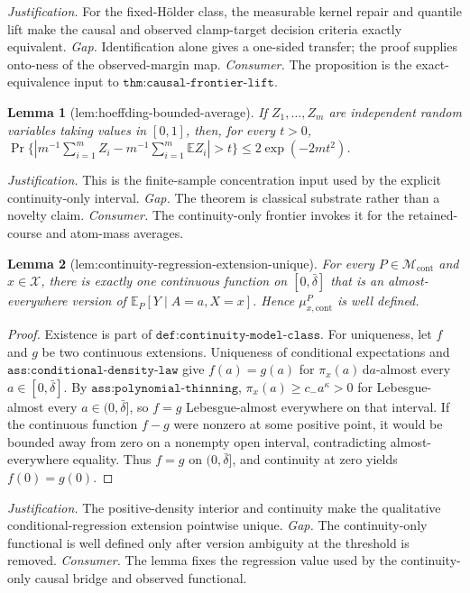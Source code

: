\documentclass{article}
\newtheorem{lemma}{Lemma}
\begin{document}
\par\smallskip\noindent \textit{Justification.} For the fixed-Hölder class, the measurable kernel repair and quantile lift make the causal and observed clamp-target decision criteria exactly equivalent. \textit{Gap.} Identification alone gives a one-sided transfer; the proof supplies onto-ness of the observed-margin map. \textit{Consumer.} The proposition is the exact-equivalence input to \(\texttt{thm:causal-frontier-lift}\).

\begin{lemma}[lem:hoeffding-bounded-average]\label{lem:hoeffding-bounded-average}
If \(Z_1,\ldots,Z_m\) are independent random variables taking values in \([0,1]\), then, for every \(t>0\), \(\Pr\{|m^{-1}\sum_{i=1}^m Z_i-m^{-1}\sum_{i=1}^m\mathbb E Z_i|>t\}\leq2\exp(-2mt^2)\).
\end{lemma}
\par\smallskip\noindent \textit{Justification.} This is the finite-sample concentration input used by the explicit continuity-only interval. \textit{Gap.} The theorem is classical substrate rather than a novelty claim. \textit{Consumer.} The continuity-only frontier invokes it for the retained-course and atom-mass averages.

\begin{lemma}[lem:continuity-regression-extension-unique]\label{lem:continuity-regression-extension-unique}
For every \(P\in\mathcal M_{\mathrm{cont}}\) and \(x\in\mathcal X\), there is exactly one continuous function on \([0,\bar\delta]\) that is an almost-everywhere version of \(\mathbb E_P[Y\mid A=a,X=x]\).  Hence \(\mu_{x,\mathrm{cont}}^P\) is well defined.
\end{lemma}
\begin{proof}
Existence is part of \(\texttt{def:continuity-model-class}\).  For uniqueness, let \(f\) and \(g\) be two continuous extensions.  Uniqueness of conditional expectations and \(\texttt{ass:conditional-density-law}\) give \(f(a)=g(a)\) for \(\pi_x(a)\,\mathrm da\)-almost every \(a\in[0,\bar\delta]\).  By \(\texttt{ass:polynomial-thinning}\), \(\pi_x(a)\geq c_-a^\kappa>0\) for Lebesgue-almost every \(a\in(0,\bar\delta]\), so \(f=g\) Lebesgue-almost everywhere on that interval.  If the continuous function \(f-g\) were nonzero at some positive point, it would be bounded away from zero on a nonempty open interval, contradicting almost-everywhere equality.  Thus \(f=g\) on \((0,\bar\delta]\), and continuity at zero yields \(f(0)=g(0)\).
\end{proof}
\par\smallskip\noindent \textit{Justification.} The positive-density interior and continuity make the qualitative conditional-regression extension pointwise unique. \textit{Gap.} The continuity-only functional is well defined only after version ambiguity at the threshold is removed. \textit{Consumer.} The lemma fixes the regression value used by the continuity-only causal bridge and observed functional.
\end{document}
